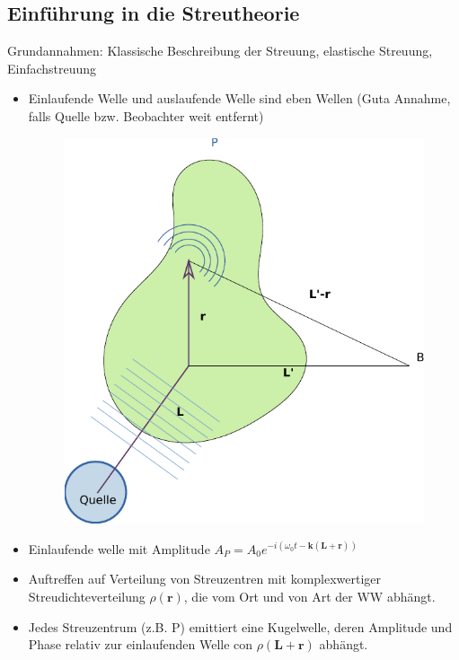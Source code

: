 \subsection{Einführung in die Streutheorie} \label{kap:3_1}
Grundannahmen: Klassische Beschreibung der Streuung, elastische Streuung, Einfachstreuung
\begin{itemize}
    \item Einlaufende Welle und auslaufende Welle sind eben Wellen (Guta Annahme, falls Quelle bzw. Beobachter weit entfernt)
          \begin{figure}[H]
              \centering
              \includegraphics{figures/2_4Birne.pdf}
              \caption{}
              \label{}
          \end{figure}
    \item Einlaufende welle mit Amplitude $A_P = A_0 e^{-i(\omega_0 t - \textbf{k} ( \textbf{L} + \textbf{r}))}$
    \item Auftreffen auf Verteilung von Streuzentren mit komplexwertiger Streudichteverteilung $\rho(\textbf{r})$, die vom Ort und von Art der WW abhängt.
    \item Jedes Streuzentrum (z.B. P) emittiert eine Kugelwelle, deren Amplitude und Phase relativ zur einlaufenden Welle con $\rho(\textbf{L} + \textbf{r})$ abhängt.

\end{itemize}
